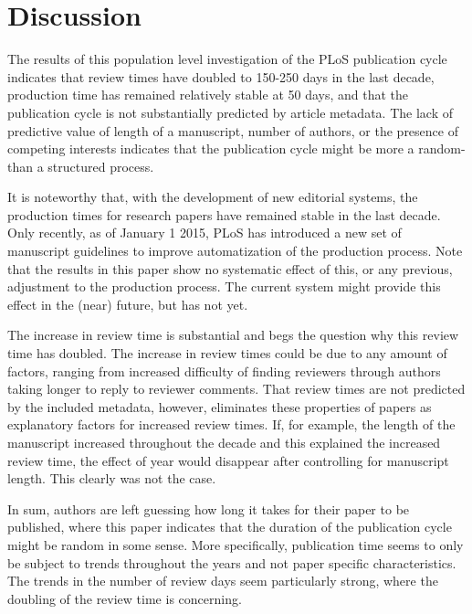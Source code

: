 \section*{Discussion}
The results of this population level investigation of the PLoS publication cycle indicates that review times have doubled to 150-250 days in the last decade, production time has remained relatively stable at 50 days, and that the publication cycle is not substantially predicted by article metadata. The lack of predictive value of length of a manuscript, number of authors, or the presence of competing interests indicates that the publication cycle might be more a random- than a structured process. 

It is noteworthy that, with the development of new editorial systems, the production times for research papers have remained stable in the last decade. Only recently, as of January 1 2015, PLoS has introduced a new set of manuscript guidelines to improve automatization of the production process. Note that the results in this paper show no systematic effect of this, or any previous, adjustment to the production process. The current system might provide this effect in the (near) future, but has not yet.

The increase in review time is substantial and begs the question why this review time has doubled. The increase in review times could be due to any amount of factors, ranging from increased difficulty of finding reviewers through authors taking longer to reply to reviewer comments. That review times are not predicted by the included metadata, however, eliminates these properties of papers as explanatory factors for increased review times. If, for example, the length of the manuscript increased throughout the decade and this explained the increased review time, the effect of year would disappear after controlling for manuscript length. This clearly was not the case.

In sum, authors are left guessing how long it takes for their paper to be published, where this paper indicates that the duration of the publication cycle might be random in some sense. More specifically, publication time seems to only be subject to trends throughout the years and not paper specific characteristics. The trends in the number of review days seem particularly strong, where the doubling of the review time is concerning.
  
  